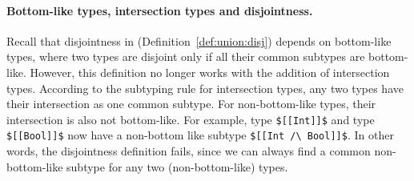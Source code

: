 
\paragraph*{Bottom-like types, intersection types and disjointness.}
\noindent %
Recall that disjointness in  (Definition~\ref{def:union:disj}) depends
on bottom-like types, where two types are disjoint only if all their common
subtypes are bottom-like. However, this definition no longer works with the
addition of intersection types. According to the subtyping rule
for intersection types, any two types have their intersection as one common subtype.
For non-bottom-like types, their intersection is also not bottom-like. For
example, type \lstinline{$[[Int]]$} and type \lstinline{$[[Bool]]$} now have a non-bottom like subtype
\lstinline{$[[Int /\ Bool]]$}.
In other words, the disjointness definition fails, since we
can always find a common non-bottom-like subtype for any two (non-bottom-like)
types.

\begin{comment}
Reader may think at this point to add intersection of non-overlapping types such as $[[Int /\ Bool]]$
in bottom-like types to solve the problem. A trivial and intuitive approach to think of is:

\begin{center}
\drule[]{bl-andsub}
\end{center}

\noindent \Rref{bl-andsub} states that if two types $[[A]]$ and $[[B]]$
are not subtypes of each other (i.e. non-overlapping) then intersection of
such types $[[A /\ B]]$ is bottom-like.
\Rref{bl-andsub} works for simple cases such as $[[Int]]$ and $[[Bool]]$.
But it fails if  $[[A]]$ = $[[Int /\ Bool]]$ and
$[[B]]$ = $[[Int /\ Bool]]$.
Because $[[A]]$ ($[[Int /\ Bool]]$) and $[[B]]$ ($[[Int /\ Bool]]$) are subtypes
of each other and are not bottom-like as per \rref{bl-andsub}.
So, naive addition of \rref{bl-andsub} skips potential bottom-like types.
Another alternative may be:

\begin{center}
\drule[]{bl-anddisj}
\end{center}

\noindent \Rref{bl-anddisj} states that if two types $[[A]]$ and $[[B]]$ are disjoint,
then intersection of such types $[[A /\ B]]$ is bottom-like.
But \rref{bl-anddisj} imposes additional complexities of mutually
dependent definitions among disjointness and bottom-like.
This makes completeness challenging or even impossible to prove.
\end{comment}
